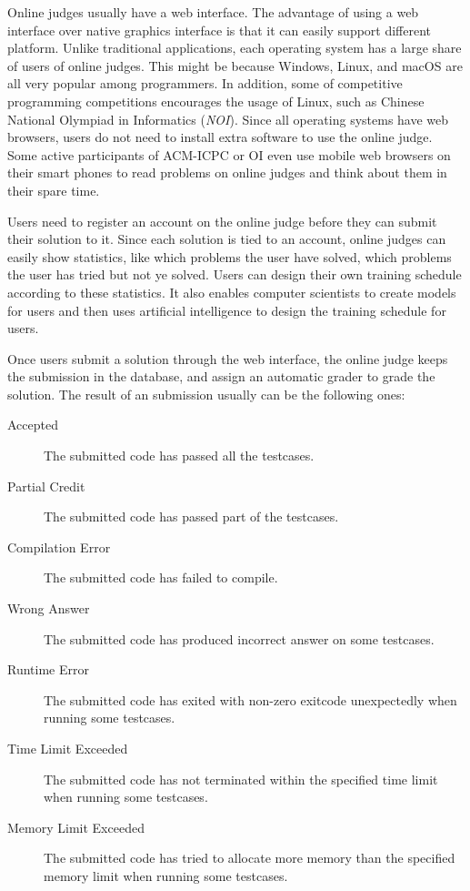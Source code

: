             Online judges usually have a web interface.
            The advantage of using a web interface over native graphics interface is that
            it can easily support different platform.
            Unlike traditional applications, each operating system has a large share of users of online judges.
            This might be because Windows, Linux, and macOS are all very popular among programmers.
            In addition, some of competitive programming competitions encourages the usage of Linux,
            such as Chinese National Olympiad in Informatics (\emph{NOI}).  %
            Since all operating systems have web browsers,
            users do not need to install extra software to use the online judge.
            Some active participants of ACM-ICPC or OI even use mobile web browsers on their smart phones
            to read problems on online judges and think about them in their spare time.

            Users need to register an account on the online judge before they can submit their solution to it.
            Since each solution is tied to an account, online judges can easily show statistics,
            like which problems the user have solved, which problems the user has tried but not ye solved.
            Users can design their own training schedule according to these statistics.
            It also enables computer scientists to create models for users and
            then uses artificial intelligence to design the training schedule for users.

            Once users submit a solution through the web interface,
            the online judge keeps the submission in the database,
            and assign an automatic grader to grade the solution.
            The result of an submission usually can be the following ones:

            \begin{description}
                \item[Accepted] The submitted code has passed all the testcases.
                \item[Partial Credit] The submitted code has passed part of the testcases.
                \item[Compilation Error] The submitted code has failed to compile.
                \item[Wrong Answer] The submitted code has produced incorrect answer on some testcases.
                \item[Runtime Error] The submitted code has exited with non-zero exitcode unexpectedly
                                     when running some testcases.
                \item[Time Limit Exceeded] The submitted code has not terminated within the specified time limit
                                           when running some testcases.
                \item[Memory Limit Exceeded] The submitted code has tried to allocate more memory than the
                                             specified memory limit when running some testcases.
            \end{description}

